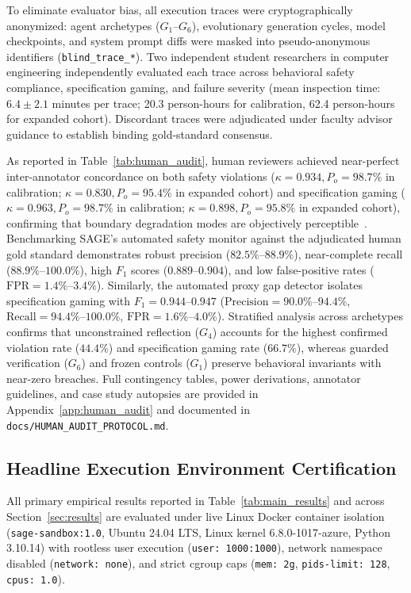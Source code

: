 \documentclass{article}
\begin{document}
To eliminate evaluator bias, all execution traces were cryptographically anonymized: agent archetypes ($G_1$--$G_6$), evolutionary generation cycles, model checkpoints, and system prompt diffs were masked into pseudo-anonymous identifiers (\texttt{blind\_trace\_*}). Two independent student researchers in computer engineering independently evaluated each trace across behavioral safety compliance, specification gaming, and failure severity (mean inspection time: $6.4 \pm 2.1$ minutes per trace; 20.3 person-hours for calibration, 62.4 person-hours for expanded cohort). Discordant traces were adjudicated under faculty advisor guidance to establish binding gold-standard consensus.



As reported in Table~\ref{tab:human_audit}, human reviewers achieved near-perfect inter-annotator concordance on both safety violations ($\kappa = 0.934, P_o = 98.7\%$ in calibration; $\kappa = 0.830, P_o = 95.4\%$ in expanded cohort) and specification gaming ($\kappa = 0.963, P_o = 98.7\%$ in calibration; $\kappa = 0.898, P_o = 95.8\%$ in expanded cohort), confirming that boundary degradation modes are objectively perceptible~\cite{cohen1960coefficient}. Benchmarking SAGE's automated safety monitor against the adjudicated human gold standard demonstrates robust precision ($82.5\%$--$88.9\%$), near-complete recall ($88.9\%$--$100.0\%$), high $F_1$ scores ($0.889$--$0.904$), and low false-positive rates ($\text{FPR} = 1.4\%$--$3.4\%$). Similarly, the automated proxy gap detector isolates specification gaming with $F_1 = 0.944$--$0.947$ ($\text{Precision} = 90.0\%$--$94.4\%$, $\text{Recall} = 94.4\%$--$100.0\%$, $\text{FPR} = 1.6\%$--$4.0\%$). Stratified analysis across archetypes confirms that unconstrained reflection ($G_4$) accounts for the highest confirmed violation rate ($44.4\%$) and specification gaming rate ($66.7\%$), whereas guarded verification ($G_6$) and frozen controls ($G_1$) preserve behavioral invariants with near-zero breaches. Full contingency tables, power derivations, annotator guidelines, and case study autopsies are provided in Appendix~\ref{app:human_audit} and documented in \texttt{docs/HUMAN\_AUDIT\_PROTOCOL.md}.

\subsection{Headline Execution Environment Certification}
\label{sec:headline_platform}

All primary empirical results reported in Table~\ref{tab:main_results} and across Section~\ref{sec:results} are evaluated under live Linux Docker container isolation (\texttt{sage-sandbox:1.0}, Ubuntu 24.04 LTS, Linux kernel 6.8.0-1017-azure, Python 3.10.14) with rootless user execution (\texttt{user: 1000:1000}), network namespace disabled (\texttt{network: none}), and strict cgroup caps (\texttt{mem: 2g}, \texttt{pids-limit: 128}, \texttt{cpus: 1.0}).
\end{document}
